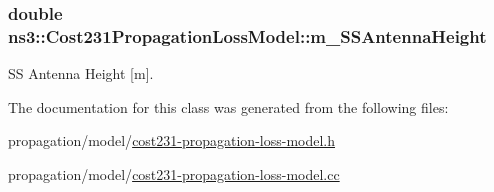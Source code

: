 \subsubsection[{\texorpdfstring{m\+\_\+\+S\+S\+Antenna\+Height}{m_SSAntennaHeight}}]{\setlength{\rightskip}{0pt plus 5cm}double ns3\+::\+Cost231\+Propagation\+Loss\+Model\+::m\+\_\+\+S\+S\+Antenna\+Height\hspace{0.3cm}{\ttfamily [private]}}\hypertarget{classns3_1_1Cost231PropagationLossModel_a143ebc7328775a1c8b5c48ec12692dc1}{}\label{classns3_1_1Cost231PropagationLossModel_a143ebc7328775a1c8b5c48ec12692dc1}


SS Antenna Height \mbox{[}m\mbox{]}. 



The documentation for this class was generated from the following files\+:\begin{DoxyCompactItemize}
\item 
propagation/model/\hyperlink{cost231-propagation-loss-model_8h}{cost231-\/propagation-\/loss-\/model.\+h}\item 
propagation/model/\hyperlink{cost231-propagation-loss-model_8cc}{cost231-\/propagation-\/loss-\/model.\+cc}\end{DoxyCompactItemize}
